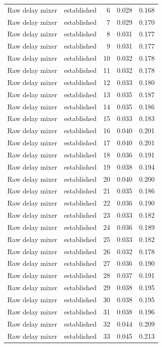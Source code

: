 \begin{tabular}{llrrr}
Raw delay mixer & established & 6 & 0.028 & 0.168 \\
Raw delay mixer & established & 7 & 0.029 & 0.170 \\
Raw delay mixer & established & 8 & 0.031 & 0.177 \\
Raw delay mixer & established & 9 & 0.031 & 0.177 \\
Raw delay mixer & established & 10 & 0.032 & 0.178 \\
Raw delay mixer & established & 11 & 0.032 & 0.178 \\
Raw delay mixer & established & 12 & 0.033 & 0.180 \\
Raw delay mixer & established & 13 & 0.035 & 0.187 \\
Raw delay mixer & established & 14 & 0.035 & 0.186 \\
Raw delay mixer & established & 15 & 0.033 & 0.183 \\
Raw delay mixer & established & 16 & 0.040 & 0.201 \\
Raw delay mixer & established & 17 & 0.040 & 0.201 \\
Raw delay mixer & established & 18 & 0.036 & 0.191 \\
Raw delay mixer & established & 19 & 0.038 & 0.194 \\
Raw delay mixer & established & 20 & 0.040 & 0.200 \\
Raw delay mixer & established & 21 & 0.035 & 0.186 \\
Raw delay mixer & established & 22 & 0.036 & 0.190 \\
Raw delay mixer & established & 23 & 0.033 & 0.182 \\
Raw delay mixer & established & 24 & 0.036 & 0.189 \\
Raw delay mixer & established & 25 & 0.033 & 0.182 \\
Raw delay mixer & established & 26 & 0.032 & 0.178 \\
Raw delay mixer & established & 27 & 0.036 & 0.190 \\
Raw delay mixer & established & 28 & 0.037 & 0.191 \\
Raw delay mixer & established & 29 & 0.038 & 0.195 \\
Raw delay mixer & established & 30 & 0.038 & 0.195 \\
Raw delay mixer & established & 31 & 0.038 & 0.196 \\
Raw delay mixer & established & 32 & 0.044 & 0.209 \\
Raw delay mixer & established & 33 & 0.045 & 0.213 \\

\end{tabular}
